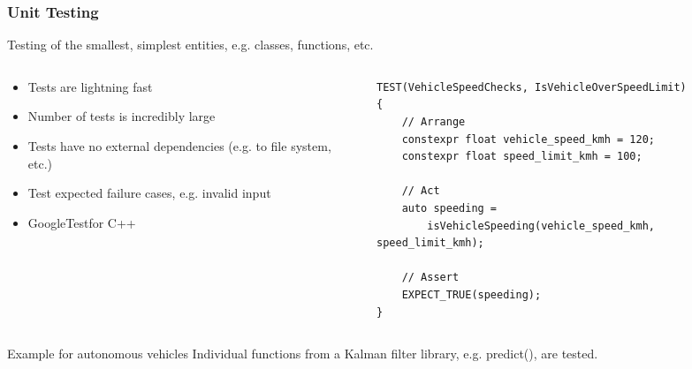 \begin{frame}[fragile]
\frametitle{Unit Testing}
Testing of the smallest, simplest entities, e.g. classes, functions, etc.\\
\begin{columns}[]
    \begin{column}{0.5\textwidth}
        \begin{itemize}
            \item Tests are lightning fast
            \item Number of tests is incredibly large
            \item Tests have no external dependencies (e.g. to file system, etc.)
            \item Test expected failure cases, e.g. invalid input
            \item GoogleTest\footnotemark[1] for C++
        \end{itemize}
    \end{column}
    \begin{column}{0.5\textwidth}
\tiny
\begin{verbatim}
TEST(VehicleSpeedChecks, IsVehicleOverSpeedLimit)
{
    // Arrange
    constexpr float vehicle_speed_kmh = 120;
    constexpr float speed_limit_kmh = 100;

    // Act
    auto speeding =
        isVehicleSpeeding(vehicle_speed_kmh, speed_limit_kmh);

    // Assert
    EXPECT_TRUE(speeding);
}
\end{verbatim}
    \end{column}
\end{columns}
\begin{exampleblock}{Example for autonomous vehicles}
Individual functions from a Kalman filter library, e.g. predict(), are tested.
\end{exampleblock}
\end{frame}


